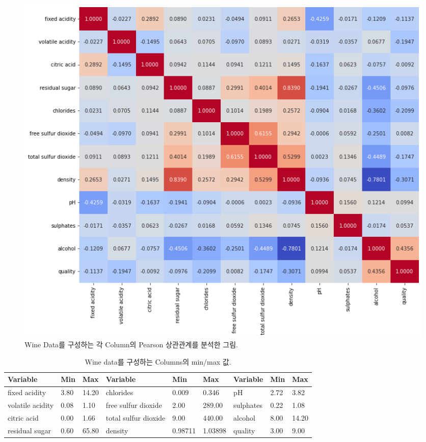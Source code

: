\documentclass[letterpaper,10pt]{article}
\begin{document}
	\begin{figure}
		\centering
		\includegraphics[width=\linewidth]{images/corr.png}
		\caption{Wine Data를 구성하는 각 Column의 Pearson 상관관계를 분석한 그림.}
		\label{fig:corr}
	\end{figure}

	\begin{table}
		\centering
		\begin{tabular}{l|l|l||l|l|l||l|l|l}
			\hline
			\textbf{Variable} & \textbf{Min} & \textbf{Max} & \textbf{Variable}    & \textbf{Min} & \textbf{Max} & \textbf{Variable} & \textbf{Min} & \textbf{Max} \\ \hline
			fixed acidity     & 3.80         & 14.20        & chlorides            & 0.009        & 0.346        & pH                & 2.72         & 3.82         \\ \hline
			volatile acidity  & 0.08         & 1.10         & free sulfur dioxide  & 2.00         & 289.00       & sulphates         & 0.22         & 1.08         \\ \hline
			citric acid       & 0.00         & 1.66         & total sulfur dioxide & 9.00         & 440.00       & alcohol           & 8.00         & 14.20        \\ \hline
			residual sugar    & 0.60         & 65.80        & density              & 0.98711      & 1.03898      & quality           & 3.00         & 9.00         \\ \hline
		\end{tabular}
		\caption{Wine data를 구성하는 Columns의 min/max 값.}
		\label{tab:minmax}
	\end{table}
\end{document}
